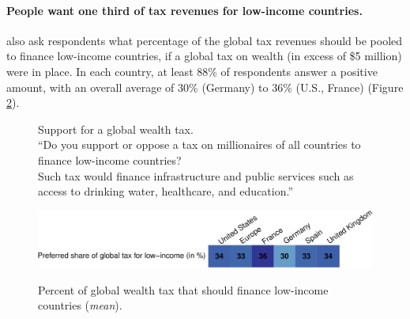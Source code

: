 \documentclass[12pt,english]{article}
\begin{document}
\paragraph{People want one third of tax revenues for low-income countries.} \citet{fabre_international_2023} also ask respondents what percentage of the global tax revenues should be pooled to finance low-income countries, if a global tax on wealth (in excess of \$5 million) were in place. In each country, at least 88\% of respondents answer a positive amount, with an overall average of 30\% (Germany) to 36\% (U.S., France) (Figure \ref{fig:global_share_mean}).

\begin{figure}[h!] 
    \caption[Support for a global wealth tax]{Support for a global wealth tax. \\
    ``Do you support or oppose a tax on millionaires of all countries to finance low-income countries? \\
    Such tax would finance infrastructure and public services such as access to drinking water, healthcare, and education.''}\label{fig:global_tax}
\end{figure}

\begin{figure}
    \centering 
    \caption[Preferred share of wealth tax for low-income countries]{Percent of global wealth tax that should finance low-income countries (\textit{mean}).} 
    \includegraphics[width=1\textwidth]{../figures/country_comparison/global_tax_global_share_mean.pdf} \label{fig:global_share_mean}
\end{figure}

\end{document}
